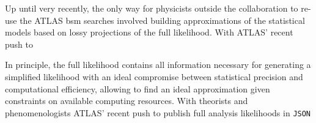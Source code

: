 Up until very recently, the only way for physicists outside the collaboration to re-use the ATLAS \gls{bsm} searches involved building approximations of the statistical models based on lossy projections of the full likelihood. With ATLAS' recent push to 
 
In principle, the full likelihood contains all information necessary for generating a simplified likelihood with an ideal compromise between statistical precision and computational efficiency, allowing to find an ideal approximation given constraints on available computing resources. With theorists and phenomenologists  ATLAS' recent push to publish full analysis likelihoods in \texttt{JSON}




